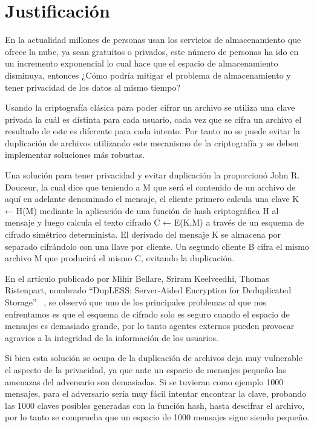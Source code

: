 \section{Justificación}

En la actualidad millones de personas usan los servicios de almacenamiento que ofrece la nube, ya sean gratuitos o privados, este número de personas ha ido en un incremento exponencial lo cual hace que el espacio de almacenamiento disminuya, entonces ¿Cómo podría mitigar el problema de almacenamiento y tener privacidad de los datos al mismo tiempo?

Usando la criptografía clásica para poder cifrar un archivo se utiliza una clave privada la cuál es distinta para cada usuario, cada vez que se cifra un archivo el resultado de este es diferente para cada intento. Por tanto no se puede evitar la duplicación de archivos utilizando este mecanismo de la criptografía y se deben implementar soluciones más robustas.

Una solución para tener privacidad y evitar duplicación la proporcionó John R. Douceur, la cual dice que teniendo a M que será el contenido de un archivo de aquí en adelante denominado el mensaje, el cliente primero calcula una clave K ← H(M) mediante la aplicación de una función de hash criptográfica H al mensaje y luego calcula el texto cifrado C ← E(K,M) a través de un esquema de cifrado simétrico determinista. El derivado del mensaje K se almacena por separado cifrándolo con una llave por cliente. Un segundo cliente B cifra el mismo archivo M que producirá el mismo C, evitando la duplicación. ~\cite{donceur}

En el artículo publicado por Mihir Bellare, Sriram Keelveedhi, Thomas Ristenpart, nombrado “DupLESS: Server-Aided Encryption for Deduplicated Storage” ~\cite{Bellare}, se observó que uno de los principales problemas al que nos enfrentamos es que el esquema de cifrado solo es seguro cuando el espacio de mensajes es demasiado grande, por lo tanto agentes externos pueden provocar agravios a la integridad de la información de los usuarios.

Si bien esta solución se ocupa de la duplicación de archivos deja muy vulnerable el aspecto de la privacidad, ya que ante un espacio de mensajes pequeño las amenazas del adversario son demasiadas. Si se tuvieran como ejemplo 1000 mensajes, para el adversario sería muy fácil intentar encontrar la clave, probando las 1000 claves posibles generadas con la función hash, hasta descifrar el archivo, por lo tanto se comprueba que un espacio de 1000 mensajes sigue siendo pequeño.

